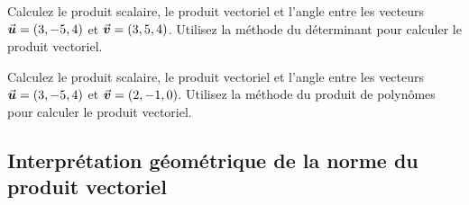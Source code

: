 \begin{exerciceC}
Calculez le produit scalaire, le produit vectoriel et l'angle entre les vecteurs
$\vec{\boldsymbol{u}} = (3, -5, 4)$ et $\vec{\boldsymbol{v}} = (3, 5, 4)$.  Utilisez la méthode du déterminant
pour calculer le produit vectoriel.
\end{exerciceC}
\begin{exerciceC}
Calculez le produit scalaire, le produit vectoriel et l'angle entre les vecteurs
$\vec{\boldsymbol{u}} = (3, -5, 4)$ et $\vec{\boldsymbol{v}} = (2, -1, 0)$.  Utilisez la méthode du produit
de polynômes pour calculer le produit vectoriel.
\end{exerciceC}

\subsection{Interprétation géométrique de la norme du produit vectoriel}

